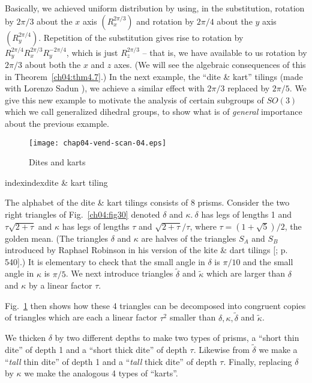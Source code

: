 \documentclass[reqno]{stml-l}
\theoremstyle{plain}
\theoremstyle{definition}
\numberwithin{equation}{chapter}
\begin{document}
Basically, we achieved uniform distribution by using, in the substitution, rotation by $2\pi/3$ about the $x$ axis $(R_{x}^{2\pi/3})$ and rotation by $2\pi/4$ about the $y$ axis $(R_{y}^{2\pi/4})$. Repetition of the substitution gives rise to rotation by $R_{y}^{2\pi/4}R_{x}^{2\pi/3}R_{y}^{-2\pi/4}$, which is just $R_{z}^{2\pi/3}$ -- that is, we have available to us rotation by $2\pi/3$ about both the $x$ and $z$ axes. (We will see the algebraic consequences of this in Theorem~\ref{ch04:thm4.7}.) In the next example, the ``dite \& kart'' tilings (made with Lorenzo Sadun \cite{bib:RS1}), we achieve a similar effect with $2\pi/3$ replaced by $2\pi/5$. We
give this new example to motivate the analysis of certain subgroups
of $SO(3)$ which we call generalized dihedral groups, to show what is
of \emph{general} importance about the previous example.

\begin{figure}[!h]
\texttt{[image: chap04-vend-scan-04.eps]}
\caption{Dites and karts}\label{ch04:fig33}
\end{figure}index{index}{dite \& kart tiling}

The alphabet of the dite \& kart tilings consists of 8 prisms. Consider the two right triangles of Fig.~\ref{ch04:fig30} denoted $\delta$ and $\kappa.\ \delta$ has legs of lengths 1 and $\tau\sqrt{2+\tau}$ and $\kappa$ has legs of lengths $\tau$ and $\sqrt{2+\tau}/\tau$, where $\tau=(1+\sqrt{5})/2$, the golden mean. (The triangles $\delta$ and $\kappa$ are halves of the triangles $S_{A}$ and $S_{B}$ introduced by Raphael Robinson in his version of the kite \& dart tilings [; p. 540].) It is elementary to check that the small angle in $\delta$ is $\pi/10$ and the small angle in $\kappa$ is $\pi/5$. We next introduce triangles $\tilde{\delta}$ and $\tilde{\kappa}$ which are larger than $\delta$ and $\kappa$ by a linear factor $\tau$.

Fig.~\ref{ch04:fig33} then shows how these 4 triangles can be decomposed into congruent copies of triangles which are each a linear factor $\tau^{2}$ smaller than $\delta,\kappa,\tilde{\delta}$ and $\tilde{\kappa}$.

We thicken $\delta$ by two different depths to make two types of prisms, a ``short thin dite'' of depth 1 and a ``short thick dite'' of depth $\tau$. Likewise from $\tilde{\delta}$ we make a ``\emph{tall} thin dite'' of depth 1 and a ``\emph{tall} thick dite'' of depth $\tau$. Finally, replacing $\delta$ by $\kappa$ we make the analogous 4 types of ``karts''.
\end{document}

